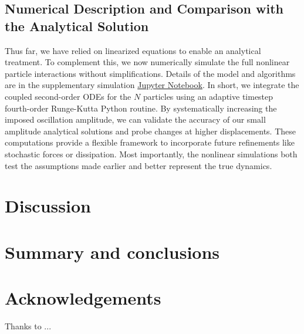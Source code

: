 \documentclass[final,5p,times,twocolumn,authoryear]{elsarticle}
\begin{document}
\subsection{Numerical Description and Comparison with the Analytical Solution}
Thus far, we have relied on linearized equations to enable an analytical treatment. To complement this, we now numerically simulate the full nonlinear particle interactions without simplifications. Details of the model and algorithms are in the supplementary simulation \href{https://github.com/a-samea/Waves-CourseProject/blob/main/Simulations/N%20Particle.ipynb}{Jupyter Notebook}. In short, we integrate the coupled second-order ODEs for the $N$ particles using an adaptive timestep fourth-order Runge-Kutta Python routine. By systematically increasing the imposed oscillation amplitude, we can validate the accuracy of our small amplitude analytical solutions and probe changes at higher displacements. These computations provide a flexible framework to incorporate future refinements like stochastic forces or dissipation. Most importantly, the nonlinear simulations both test the assumptions made earlier and better represent the true dynamics.



\section{Discussion}

\section{Summary and conclusions}


\section*{Acknowledgements}
Thanks to ...


 







\end{document}
